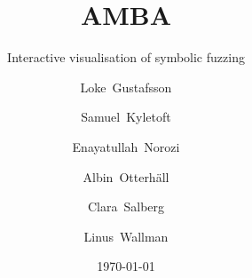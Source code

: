 \documentclass[tikz]{beamer}
\begin{document}

\title{AMBA}
\subtitle{Interactive visualisation of symbolic fuzzing}
\author[Bachelor's project 64]{
	\mbox{Loke Gustafsson} \and
	\mbox{Samuel Kyletoft} \and
	\mbox{Enayatullah Norozi} \and
	\mbox{Albin Otterhäll} \and
	\mbox{Clara Salberg} \and
	\mbox{Linus Wallman}
}
\date{\today}

\frame{\titlepage}

















\end{document}
